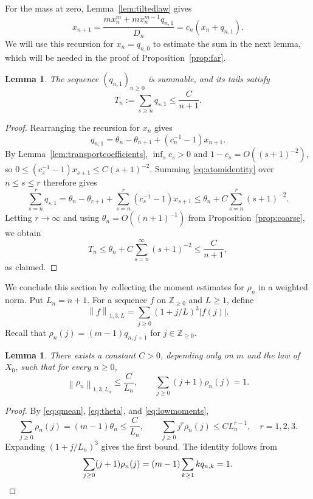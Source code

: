 \documentclass[11pt,letterpaper,reqno]{amsart}
\numberwithin{equation}{section}
\theoremstyle{plain}
\newtheorem{lemma}[theorem]{Lemma}
\theoremstyle{remark}
\newcommand{\Zp}{\mathbb Z_{\ge0}}
\newcommand{\norm}[1]{\left\lVert#1\right\rVert}
\begin{document}
For the mass at zero, Lemma~\ref{lem:tiltedlaw} gives
\[
 x_{n+1}=\frac{mx_n^m+mx_n^{m-1}q_{n,1}}{D_n}
 =c_n(x_n+q_{n,1}).
\]
We will use this recursion for $x_n=q_{n,0}$ to estimate the sum in the next lemma, which will be needed in the proof of Proposition~\ref{prop:far}.
\begin{lemma}\label{lem:atomtail}
The sequence $(q_{n,1})_{n\ge0}$ is summable, and its tails satisfy
\begin{equation}\label{eq:atomtail}
 T_n:=\sum_{s\ge n}q_{s,1}\le\frac C{n+1}.
\end{equation}
\end{lemma}
\begin{proof}
Rearranging the recursion for $x_n$ gives
\begin{equation}\label{eq:atomidentity}
 q_{n,1}=\theta_n-\theta_{n+1}+(c_n^{-1}-1)x_{n+1}.
\end{equation}
By Lemma~\ref{lem:transportcoefficients}, $\inf_s c_s>0$ and
$1-c_s=O((s+1)^{-2})$, so
$0\le(c_s^{-1}-1)x_{s+1}\le C(s+1)^{-2}$.
Summing \eqref{eq:atomidentity} over $n\le s\le r$ therefore gives
\[
 \sum_{s=n}^r q_{s,1}
 =\theta_n-\theta_{r+1}+\sum_{s=n}^r(c_s^{-1}-1)x_{s+1}
 \le\theta_n+C\sum_{s=n}^r(s+1)^{-2}.
\]
Letting $r\to\infty$ and using $\theta_n=O((n+1)^{-1})$
from Proposition~\ref{prop:coarse}, we obtain
\[
 T_n\le\theta_n+C\sum_{s=n}^{\infty}(s+1)^{-2}
 \le\frac C{n+1},
\]
as claimed.
\end{proof}

We conclude this section by collecting the moment estimates for $\rho_n$ in a weighted norm.
Put $L_n=n+1$. For a sequence $f$ on $\Zp$ and $L\ge1$, define
\[
 \norm f_{1,3,L}=\sum_{j\ge0}(1+j/L)^3|f(j)|.
\]
Recall that $\rho_n(j)=(m-1)q_{n,j+1}$ for $j\in\Zp$.
\begin{lemma}\label{lem:weightedmass}
There exists a constant $C>0$, depending only on $m$ and the law of $X_0$, such that for every $n\ge0$,
\begin{equation}\label{eq:weightedmass}
 \norm{\rho_n}_{1,3,L_n}\le\frac C{L_n},\qquad
 \sum_{j\ge0}(j+1)\rho_n(j)=1.
\end{equation}
\end{lemma}
\begin{proof}
By \eqref{eq:qmean}, \eqref{eq:theta}, and \eqref{eq:lowmoments},
\[
 \sum_{j\ge0}\rho_n(j)=(m-1)\theta_n\le\frac C{L_n},\qquad
 \sum_{j\ge0}j^r\rho_n(j)\le CL_n^{r-1},\quad r=1,2,3.
\]
Expanding $(1+j/L_n)^3$ gives the first bound. The identity follows from
\[
 \sum_{j\ge0}(j+1)\rho_n(j)
 =(m-1)\sum_{k\ge1}kq_{n,k}=1.\qedhere
\]
\end{proof}
\end{document}
